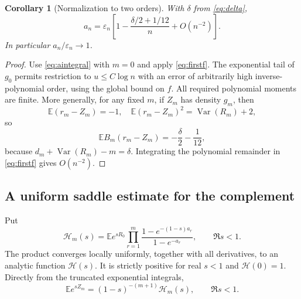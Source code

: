 \documentclass[11pt,a4paper]{article}
\numberwithin{equation}{section}
\newtheorem{corollary}[theorem]{Corollary}
\theoremstyle{definition}
\theoremstyle{remark}
\newcommand{\E}{\mathbb E}
\newcommand{\Var}{\operatorname{Var}}
\newcommand{\eps}{\varepsilon}
\newcommand{\HH}{\mathcal H}
\begin{document}
\begin{corollary}[Normalization to two orders]\label{cor:normalizer}
With $\delta$ from \eqref{eq:delta},
\begin{equation}\label{eq:normalizerexp}
a_n=\eps_n\left[1-\frac{\delta/2+1/12}{n}+O(n^{-2})\right].
\end{equation}
In particular $a_n/\eps_n\to1$.
\end{corollary}
\begin{proof}
Use \eqref{eq:aintegral} with $m=0$ and apply
\eqref{eq:firstf}. The exponential tail of $g_0$ permits restriction
to $u\le C\log n$ with an error of arbitrarily high inverse-polynomial
order, using the global bound on $f$. All required polynomial moments
are finite. More generally, for any fixed $m$, if $Z_m$ has density
$g_m$, then
\[
\E(r_m-Z_m)=-1,\quad
\E(r_m-Z_m)^2=\Var(R_m)+2,
\]
so
\begin{equation}\label{eq:meanB}
\E B_m(r_m-Z_m)=-\frac\delta2-\frac1{12},
\end{equation}
because $d_m+\Var(R_m)-m=\delta$. Integrating the polynomial remainder
in \eqref{eq:firstf} gives $O(n^{-2})$.
\end{proof}

\subsection{A uniform saddle estimate for the complement}
Put
\begin{equation}\label{eq:Hdef}
\HH_m(s)=\E e^{sR_0}\prod_{r=1}^m
 \frac{1-e^{-(1-s)a_r}}{1-e^{-a_r}},\qquad \Re s<1.
\end{equation}
The product converges locally uniformly, together with all derivatives,
to an analytic function $\HH(s)$. It is strictly positive for real $s<1$
and $\HH(0)=1$. Directly from the truncated exponential integrals,
\begin{equation}\label{eq:mgf}
\E e^{sZ_m}=(1-s)^{-(m+1)}\HH_m(s),\qquad \Re s<1.
\end{equation}
\end{document}

